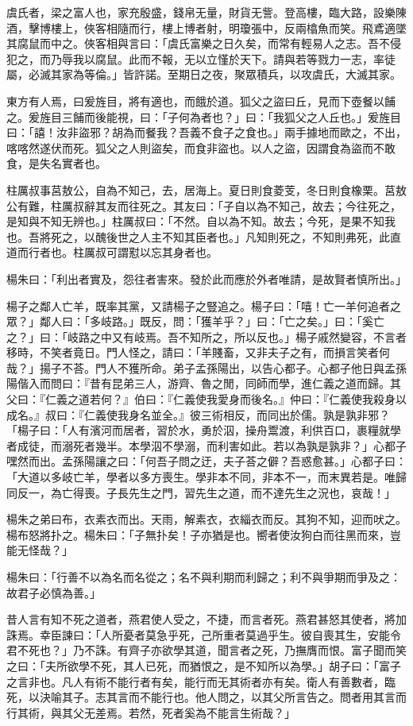 \begin{pinyinscope}
虞氏者，梁之富人也，家充殷盛，錢帛无量，財貨无訾。登高樓，臨大路，設樂陳酒，擊博樓上，俠客相隨而行，樓上博者射，明瓊張中，反兩㯓魚而笑。飛鳶適墜其腐鼠而中之。俠客相與言曰：「虞氏富樂之日久矣，而常有輕易人之志。吾不侵犯之，而乃辱我以腐鼠。此而不報，无以立慬於天下。請與若等戮力一志，率徒屬，必滅其家為等倫。」皆許諾。至期日之夜，聚眾積兵，以攻虞氏，大滅其家。

東方有人焉，曰爰旌目，將有適也，而餓於道。狐父之盜曰丘，見而下壺餐以餔之。爰旌目三餔而後能視，曰：「子何為者也？」曰：「我狐父之人丘也。」爰旌目曰：「譆！汝非盜邪？胡為而餐我？吾義不食子之食也。」兩手據地而歐之，不出，喀喀然遂伏而死。狐父之人則盜矣，而食非盜也。以人之盜，因謂食為盜而不敢食，是失名實者也。

柱厲叔事莒敖公，自為不知己，去，居海上。夏日則食菱芰，冬日則食橡栗。莒敖公有難，柱厲叔辭其友而往死之。其友曰：「子自以為不知己，故去；今往死之，是知與不知无辨也。」柱厲叔曰：「不然。自以為不知。故去；今死，是果不知我也。吾將死之，以醜後世之人主不知其臣者也。」凡知則死之，不知則弗死，此直道而行者也。柱厲叔可謂懟以忘其身者也。

楊朱曰：「利出者實及，怨往者害來。發於此而應於外者唯請，是故賢者慎所出。」

楊子之鄰人亡羊，既率其黨，又請楊子之豎追之。楊子曰：「嘻！亡一羊何追者之眾？」鄰人曰：「多岐路。」既反，問：「獲羊乎？」曰：「亡之矣。」曰：「奚亡之？」曰：「岐路之中又有岐焉。吾不知所之，所以反也。」楊子戚然變容，不言者移時，不笑者竟日。門人怪之，請曰：「羊賤畜，又非夫子之有，而損言笑者何哉？」揚子不荅。門人不獲所命。弟子孟孫陽出，以告心都子。心都子他日與孟孫陽偕入而問曰：『昔有昆弟三人，游齊、魯之閒，同師而學，進仁義之道而歸。其父曰：『仁義之道若何？』伯曰：『仁義使我愛身而後名。』仲曰：『仁義使我殺身以成名。』叔曰：『仁義使我身名並全。』彼三術相反，而同出於儒。孰是孰非邪？「楊子曰：「人有濱河而居者，習於水，勇於泅，操舟鬻渡，利供百口，裹糧就學者成徒，而溺死者幾半。本學泅不學溺，而利害如此。若以為孰是孰非？」心都子嘿然而出。孟孫陽讓之曰：「何吾子問之迂，夫子荅之僻？吾惑愈甚。」心都子曰：「大道以多岐亡羊，學者以多方喪生。學非本不同，非本不一，而末異若是。唯歸同反一，為亡得喪。子長先生之門，習先生之道，而不達先生之況也，哀哉！」

楊朱之弟曰布，衣素衣而出。天雨，解素衣，衣緇衣而反。其狗不知，迎而吠之。楊布怒將扑之。楊朱曰：「子無扑矣！子亦猶是也。嚮者使汝狗白而往黑而來，豈能无怪哉？」

楊朱曰：「行善不以為名而名從之；名不與利期而利歸之；利不與爭期而爭及之：故君子必慎為善。」

昔人言有知不死之道者，燕君使人受之，不捷，而言者死。燕君甚怒其使者，將加誅焉。幸臣諫曰：「人所憂者莫急乎死，己所重者莫過乎生。彼自喪其生，安能令君不死也？」乃不誅。有齊子亦欲學其道，聞言者之死，乃撫膺而恨。富子聞而笑之曰：「夫所欲學不死，其人已死，而猶恨之，是不知所以為學。」胡子曰：「富子之言非也。凡人有術不能行者有矣，能行而无其術者亦有矣。衛人有善數者，臨死，以決喻其子。志其言而不能行也。他人問之，以其父所言告之。問者用其言而行其術，與其父无差焉。若然，死者奚為不能言生術哉？」


\end{pinyinscope}
